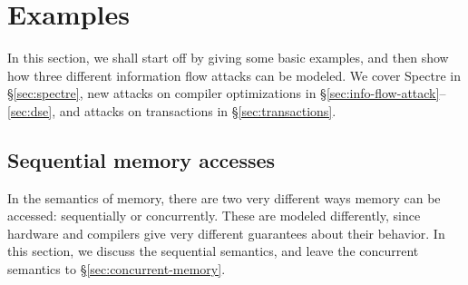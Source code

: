 \section{Examples}
\label{sec:examples}

In this section, we shall start off by giving some basic examples,
and then show how three different information flow attacks can be
modeled. We cover Spectre in \S\ref{sec:spectre}, new attacks
on compiler optimizations in \S\ref{sec:info-flow-attack}--\ref{sec:dse},
and attacks on transactions in \S\ref{sec:transactions}.

\subsection{Sequential memory accesses}
\label{sec:sequential-memory}

In the semantics of memory, there are two very different ways memory
can be accessed: sequentially or concurrently. These are modeled
differently, since hardware and compilers give very different
guarantees about their behavior.
In this section, we discuss the sequential semantics, and leave
the concurrent semantics to \S\ref{sec:concurrent-memory}.

